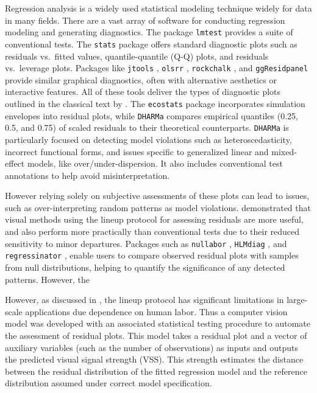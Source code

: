 \documentclass[
doublespace,
  times]{anzsauth}
\begin{document}
Regression analysis is a widely used statistical modeling technique
widely for data in many fields. There are a vast array of software for
conducting regression modeling and generating diagnostics. The package
\texttt{lmtest} \citep{lmtest} provides a suite of conventional tests.
The \texttt{stats} package \citep{stats} offers standard diagnostic
plots such as residuals vs.~fitted values, quantile-quantile (Q-Q)
plots, and residuals vs.~leverage plots. Packages like \texttt{jtools}
\citep{jtools}, \texttt{olsrr} \citep{olsrr}, \texttt{rockchalk}
\citep{rockchalk}, and \texttt{ggResidpanel} \citep{ggresidpanel}
provide similar graphical diagnostics, often with alternative aesthetics
or interactive features. All of these tools deliver the types of
diagnostic plots outlined in the classical text by
\citet{cook1982residuals}. The \texttt{ecostats} package
\citep{warton_global_2023} incorporates simulation envelopes into
residual plots, while \texttt{DHARMa} \citep{dharma} compares empirical
quantiles (0.25, 0.5, and 0.75) of scaled residuals to their theoretical
counterparts. \texttt{DHARMa} is particularly focused on detecting model
violations such as heteroscedasticity, incorrect functional forms, and
issues specific to generalized linear and mixed-effect models, like
over/under-dispersion. It also includes conventional test annotations to
help avoid misinterpretation.

However relying solely on subjective assessments of these plots can lead
to issues, such as over-interpreting random patterns as model
violations. \citet{li2024plot} demonstrated that visual methods using
the lineup protocol \citep{buja2009statistical} for assessing residuals
are more useful, and also perform more practically than conventional
tests due to their reduced sensitivity to minor departures. Packages
such as \texttt{nullabor} \citep{nullabor}, \texttt{HLMdiag}
\citep{loy2014hlmdiag}, and \texttt{regressinator}
\citep{regressinator}, enable users to compare observed residual plots
with samples from null distributions, helping to quantify the
significance of any detected patterns. However, the

However, as discussed in \citet{li2024automated}, the lineup protocol
has significant limitations in large-scale applications due dependence
on human labor. Thus a computer vision model was developed with an
associated statistical testing procedure to automate the assessment of
residual plots. This model takes a residual plot and a vector of
auxiliary variables (such as the number of observations) as inputs and
outputs the predicted visual signal strength (VSS). This strength
estimates the distance between the residual distribution of the fitted
regression model and the reference distribution assumed under correct
model specification.
\end{document}
